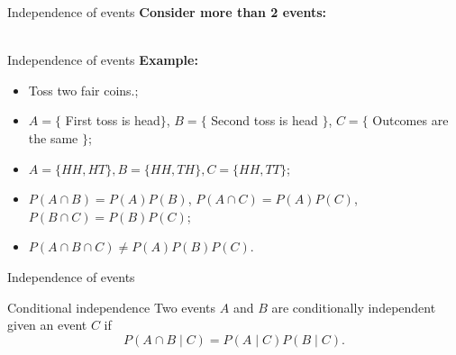 \documentclass [aspectratio=169]{beamer}
\begin{document}
\begin{frame}{Independence of events}
\textbf{Consider more than 2 events:}\\
    \\ %
    \vspace{0.2in}
\end{frame}

\begin{frame}{Independence of events}
\textbf{Example:} %
\begin{itemize}
    \item<1-> Toss two fair coins.;
    \item<1-> $A=\{$ First toss is head$\}$, $B =\{$ Second toss is head $\}$, $C = \{$ Outcomes are the same $\}$;
    \item<1-> $A = \{HH, HT\}, B = \{HH,TH\}, C = \{HH,TT\}$;
    \item<2-> $P(A \cap B) = P(A)P(B)$, $P(A \cap C) = P(A)P(C)$, $P(B \cap C) = P(B)P(C)$;
    \item<3-> $P(A\cap B\cap C) \neq P(A)P(B)P(C)$.
\end{itemize}
\vspace{0.1in}
\end{frame}

\begin{frame}{Independence of events}

\begin{block}{Conditional independence}
Two events $A$ and $B$ are conditionally independent given an event $C$ if
$$
P(A\cap B \mid C) = P(A \mid C)P(B \mid C).
$$
\end{block}
\end{frame}
\end{document}

